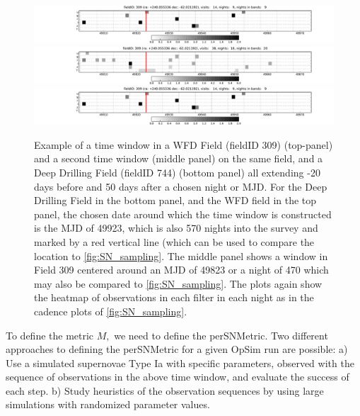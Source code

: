 \begin{figure}
\centering
 \includegraphics[width=\textwidth]{figs/supernova/TimeWindow_309_49923.pdf}
 \includegraphics[width=\textwidth]{figs/supernova/TimeWindow_309_49823.pdf}
 \includegraphics[width=\textwidth]{figs/supernova/TimeWindow_744_49923.pdf}
 \caption{Example of a time window in a WFD Field (fieldID 309)
 (top-panel) and a second time window (middle panel) on the same field,
 and a Deep Drilling Field (fieldID 744) (bottom panel) all extending
 -20 days before and 50 days after a chosen night or MJD. For the Deep
 Drilling Field in the bottom panel, and the WFD field in the top
 panel, the chosen date around which the time window is constructed is
 the MJD of 49923, which is also 570 nights into the survey and marked
 by a red vertical line (which can be used to compare the location to
 \autoref{fig:SN_sampling}. The middle panel shows a window in Field
 309 centered around an MJD of 49823 or a night of 470 which may also be
 compared to \autoref{fig:SN_sampling}. The plots again show the
 heatmap of observations in each filter in each night as in the cadence
 plots of \autoref{fig:SN_sampling}.}
  \label{fig:TimeWindow}
\end{figure}

To define the metric $M,$ we need to define the perSNMetric. Two
different approaches to defining the perSNMetric for a given OpSim run are possible: a) Use
a simulated supernovae Type Ia with specific parameters, observed with
the sequence of observations in the above time window, and evaluate the
success of each step. b) Study heuristics of the observation sequences by using large simulations 
with randomized parameter values.

